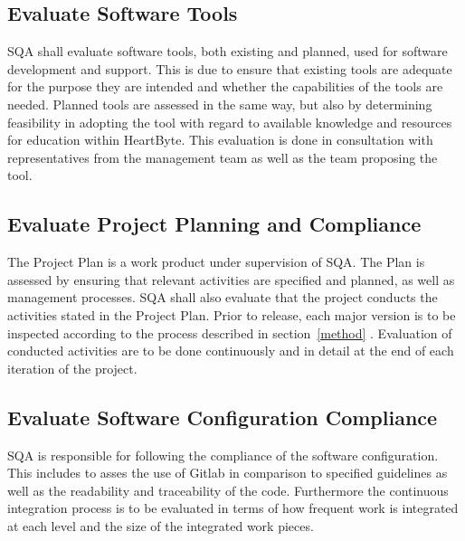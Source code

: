 \documentclass{article}
\begin{document}
	\subsection{Evaluate Software Tools}
	SQA shall evaluate software tools, both existing and planned, used for software development and support. This is due to ensure that existing tools are adequate for the purpose they are intended and whether the capabilities of the tools are needed. Planned tools are assessed in the same way, but also by determining feasibility in adopting the tool with regard to available knowledge and resources for education within HeartByte. This evaluation is done in consultation with representatives from the management team as well as the team proposing the tool.
	
	\subsection{Evaluate Project Planning and Compliance}
	The Project Plan is a work product under supervision of SQA. The Plan is assessed by ensuring that relevant activities are specified and planned, as well as management processes. SQA shall also evaluate that the project conducts the activities stated in the Project Plan. Prior to release, each major version is to be inspected according to the process described in  section~\ref{method} . Evaluation of conducted activities are to be done continuously and in detail at the end of each iteration of the project. 
	
	
	
	\subsection{Evaluate Software Configuration Compliance}
	SQA is responsible for following the compliance of the software configuration. This includes to asses the use of Gitlab in comparison to specified guidelines as well as the readability and traceability of the code. Furthermore the continuous integration process is to be evaluated in terms of how frequent work is integrated at each level and the size of the integrated work pieces.
	
\end{document}
